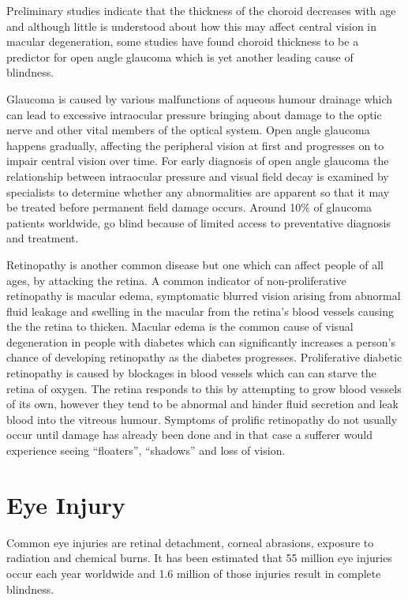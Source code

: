 Preliminary studies indicate that the thickness of the choroid decreases
with age and although little is understood about how this may affect
central vision in macular degeneration, some studies have found
choroid thickness to be a predictor for open angle glaucoma which
is yet another leading cause of blindness.\cite{margolis2009pilot,gordon2002ocular}

Glaucoma is caused by various malfunctions of aqueous humour
drainage which can lead to excessive intraocular pressure bringing
about damage to the optic nerve and other vital members of the optical
system.\cite{distelhorst2003open} Open angle glaucoma happens
gradually, affecting the peripheral vision at first and progresses on to
impair central vision over time. For early diagnosis of open angle
glaucoma the relationship between intraocular pressure and visual
field decay is examined by specialists to determine whether any
abnormalities are apparent so that it may be treated before permanent
field damage occurs.\cite{goldmann1972open} Around 10\% of
glaucoma patients worldwide, go blind because of limited access to
preventative diagnosis and treatment.\cite{west2000looking}

Retinopathy is another common disease but one which can affect people of
all ages, by attacking the retina. A common indicator of non-proliferative
retinopathy is macular edema, symptomatic blurred vision arising from
abnormal fluid leakage and swelling in the macular from the retina's
blood vessels causing the the retina to thicken.\cite{hee1995quantitative}
Macular edema is the common cause of visual degeneration in people
with diabetes which can significantly increases a person's chance of
developing retinopathy as the diabetes progresses.\cite{klein1984wisconsin}
Proliferative diabetic retinopathy is caused by blockages in blood vessels
which can can starve the retina of oxygen. The retina responds to this by
attempting to grow blood vessels of its own, however they tend to be
abnormal and hinder fluid secretion and leak blood into the vitreous
humour. Symptoms of prolific retinopathy do not usually occur until
damage has already been done and in that case a sufferer would
experience seeing \enquote{floaters}, \enquote{shadows} and loss of vision.

\section{Eye Injury}

Common eye injuries are retinal detachment, corneal abrasions, exposure to
radiation and chemical burns. It has been estimated that 55 million eye injuries
occur each year worldwide and 1.6 million of those injuries result in complete
blindness.\cite{negrel1998global}

